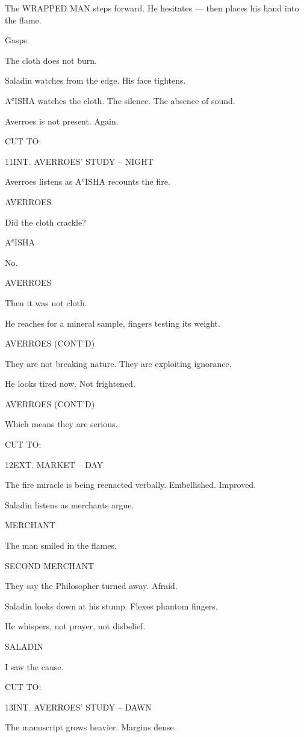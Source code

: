 \documentclass[12pt]{article}
\newlength{\charindent}
\newlength{\dialogueindent}
\newlength{\dialoguewidth}
\newlength{\transitionindent}
\newcommand{\slug}[1]{%
  \needspace{4\baselineskip}%
  \vspace{1.5em}%
  \noindent\MakeUppercase{#1}%
  \nopagebreak[4]%
  \par\vspace{0.75em}%
}
\newcommand{\action}[1]{%
  \noindent#1\par\vspace{0.75em}%
}
\newcommand{\character}[1]{%
  \needspace{3\baselineskip}%
  \par\vspace{0.5em}%
  \noindent\hspace*{\charindent}\MakeUppercase{#1}\nopagebreak[4]%
}
\newcommand{\dialogue}[1]{%
  \par\nobreak\nopagebreak[4]%
  \noindent\hspace*{\dialogueindent}%
  \begin{minipage}[t]{\dialoguewidth}
  #1
  \end{minipage}%
  \par\vspace{0.5em}%
}
\newcommand{\transition}[1]{%
  \needspace{2\baselineskip}%
  \par\vspace{1em}%
  \noindent\hspace*{\transitionindent}\MakeUppercase{#1}%
  \par%
}
\newcommand{\contd}{\textsc{(cont'd)}}
\begin{document}
\action{The WRAPPED MAN steps forward. He hesitates — then places his hand into the flame.}

\action{Gasps.}

\action{The cloth does not burn.}

\action{Saladin watches from the edge. His face tightens.}

\action{AʿISHA watches the cloth. The silence. The absence of sound.}

\action{Averroes is not present. Again.}

\transition{CUT TO:}

\slug{11\quad INT. AVERROES' STUDY -- NIGHT}

\action{Averroes listens as AʿISHA recounts the fire.}

\character{AVERROES}
\dialogue{Did the cloth crackle?}

\character{AʿISHA}
\dialogue{No.}

\character{AVERROES}
\dialogue{Then it was not cloth.}

\action{He reaches for a mineral sample, fingers testing its weight.}

\character{AVERROES \contd}
\dialogue{They are not breaking nature. They are exploiting ignorance.}

\action{He looks tired now. Not frightened.}

\character{AVERROES \contd}
\dialogue{Which means they are serious.}

\transition{CUT TO:}

\slug{12\quad EXT. MARKET -- DAY}

\action{The fire miracle is being reenacted verbally. Embellished. Improved.}

\action{Saladin listens as merchants argue.}

\character{MERCHANT}
\dialogue{The man smiled in the flames.}

\character{SECOND MERCHANT}
\dialogue{They say the Philosopher turned away. Afraid.}

\action{Saladin looks down at his stump. Flexes phantom fingers.}

\action{He whispers, not prayer, not disbelief.}

\character{SALADIN}
\dialogue{I saw the cause.}

\transition{CUT TO:}

\slug{13\quad INT. AVERROES' STUDY -- DAWN}

\action{The manuscript grows heavier. Margins dense.}
\end{document}
